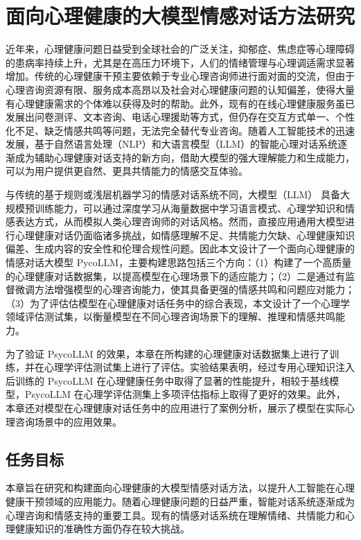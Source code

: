 
\chapter{面向心理健康的大模型情感对话方法研究}

近年来，心理健康问题日益受到全球社会的广泛关注，抑郁症、焦虑症等心理障碍的患病率持续上升，尤其是在高压力环境下，人们的情绪管理与心理调适需求显著增加。传统的心理健康干预主要依赖于专业心理咨询师进行面对面的交流，但由于心理咨询资源有限、服务成本高昂以及社会对心理健康问题的认知偏差，使得大量有心理健康需求的个体难以获得及时的帮助。此外，现有的在线心理健康服务虽已发展出问卷测评、文本咨询、电话心理援助等方式，但仍存在交互方式单一、个性化不足、缺乏情感共鸣等问题，无法完全替代专业咨询。随着人工智能技术的迅速发展，基于自然语言处理（NLP）和大语言模型（LLM）的智能心理对话系统逐渐成为辅助心理健康对话支持的新方向，借助大模型的强大理解能力和生成能力，可以为用户提供更自然、更具共情能力的情感交互体验。

与传统的基于规则或浅层机器学习的情感对话系统不同，大模型（LLM） 具备大规模预训练能力，可以通过深度学习从海量数据中学习语言模式、心理学知识和情感表达方式，从而模拟人类心理咨询师的对话风格。然而，直接应用通用大模型进行心理健康对话仍面临诸多挑战，如情感理解不足、共情能力欠缺、心理健康知识偏差、生成内容的安全性和伦理合规性问题。因此本文设计了一个面向心理健康的情感对话大模型 PycoLLM，主要构建思路包括三个方向：（1）构建了一个高质量的心理健康对话数据集，以提高模型在心理场景下的适应能力；（2）二是通过有监督微调方法增强模型的心理咨询能力，使其具备更强的情感共鸣和问题应对能力；（3）为了评估估模型在心理健康对话任务中的综合表现，本文设计了一个心理学领域评估测试集，以衡量模型在不同心理咨询场景下的理解、推理和情感共鸣能力。

为了验证 PsycoLLM 的效果，本章在所构建的心理健康对话数据集上进行了训练，并在心理学评估测试集上进行了评估。实验结果表明，经过专用心理知识注入后训练的 PsycoLLM 在心理健康任务中取得了显著的性能提升，相较于基线模型，PsycoLLM 在心理学评估测集上多项评估指标上取得了更好的效果。此外，本章还对模型在心理健康对话任务中的应用进行了案例分析，展示了模型在实际心理咨询场景中的应用效果。

\section{任务目标}

本章旨在研究和构建面向心理健康的大模型情感对话方法，以提升人工智能在心理健康干预领域的应用能力。随着心理健康问题的日益严重，智能对话系统逐渐成为心理咨询和情感支持的重要工具。现有的情感对话系统在理解情绪、共情能力和心理健康知识的准确性方面仍存在较大挑战。

